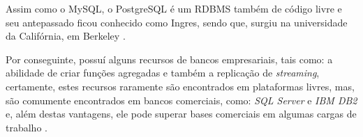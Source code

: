 Assim como o \acs{MySQL}, o \acs{PostgreSQL} é um \acs{RDBMS} também de
código livre e seu antepassado ficou conhecido como Ingres, sendo que, surgiu na
universidade da Califórnia, em Berkeley
\cite{postgreSQLIntroductionAndConcepts}.

Por conseguinte, possuí alguns recursos de bancos empresariais, tais como: a
abilidade de criar funções agregadas e também a replicação de
\textit{streaming},  certamente, estes recursos raramente são encontrados em 
plataformas livres, mas, são comumente encontrados em bancos comerciais, como:
\textit{SQL Server} e \textit{IBM DB2} e, além destas vantagens, ele pode 
superar bases comerciais  em algumas cargas de trabalho 
\cite{postgreSQLUpAndRunning}.
